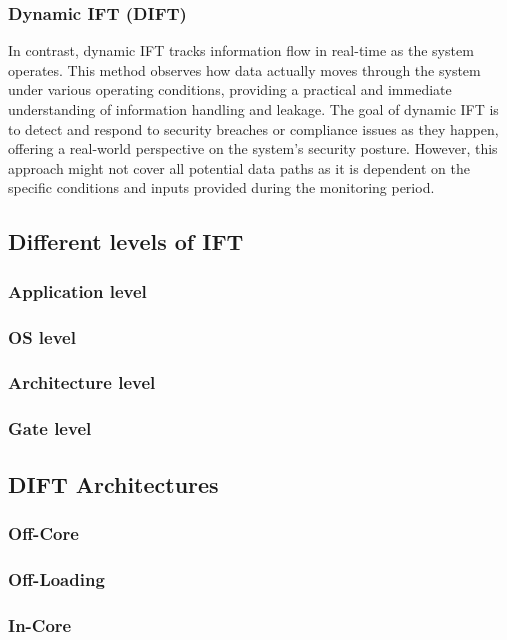         \subsubsection{Dynamic IFT (DIFT)}
        In contrast, dynamic IFT tracks information flow in real-time as the system operates. This method observes how data actually moves through the system under various operating conditions, providing a practical and immediate understanding of information handling and leakage. The goal of dynamic IFT is to detect and respond to security breaches or compliance issues as they happen, offering a real-world perspective on the system's security posture. However, this approach might not cover all potential data paths as it is dependent on the specific conditions and inputs provided during the monitoring period.
    \subsection{Different levels of IFT}
        \subsubsection{Application level}
        \subsubsection{OS level}
        \subsubsection{Architecture level}
        \subsubsection{Gate level}

    \subsection{DIFT Architectures}
        \subsubsection{Off-Core}

        \subsubsection{Off-Loading}

        \subsubsection{In-Core}
    
